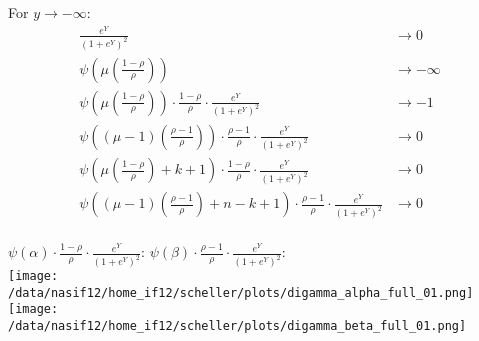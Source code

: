 \documentclass[12pt,a4paper, fleqn]{article}
\begin{document}
For $y \rightarrow -\infty$:
\begin{align*}
\frac{e^{Y}}{\left(1+e^{Y}\right)^2} &\rightarrow 0 \\
\psi\left(\mu \left(\frac{1 - \rho}{\rho}\right) \right) &\rightarrow -\infty \\
\psi\left(\mu\left(\frac{1-\rho}{\rho}\right) \right) \cdot \frac{1-\rho}{\rho} \cdot \frac{e^{Y}}{\left(1+e^{Y}\right)^2}  &\rightarrow -1 \\
\psi\left(\left(\mu - 1\right)\left(\frac{\rho - 1}{\rho}\right) \right) \cdot \frac{\rho - 1}{\rho} \cdot \frac{e^{Y}}{\left(1+e^{Y}\right)^2} &\rightarrow 0 \\
\psi\left(\mu\left(\frac{1-\rho}{\rho}\right)  + k + 1 \right) \cdot \frac{1-\rho}{\rho} \cdot \frac{e^{Y}}{\left(1+e^{Y}\right)^2}  &\rightarrow 0 \\
\psi\left(\left(\mu - 1\right)\left(\frac{\rho - 1}{\rho}\right) + n - k + 1 \right) \cdot \frac{\rho - 1}{\rho} \cdot \frac{e^{Y}}{\left(1+e^{Y}\right)^2}  &\rightarrow 0 \\
\end{align*}

$\psi(\alpha) \cdot \frac{1-\rho}{\rho} \cdot \frac{e^{Y}}{\left(1+e^{Y}\right)^2}$: \hspace{6cm} $\psi(\beta) \cdot \frac{\rho - 1}{\rho} \cdot \frac{e^{Y}}{\left(1+e^{Y}\right)^2}$:\\
\texttt{[image: /data/nasif12/home\_if12/scheller/plots/digamma\_alpha\_full\_01.png]}
\texttt{[image: /data/nasif12/home\_if12/scheller/plots/digamma\_beta\_full\_01.png]} \\
\end{document}
